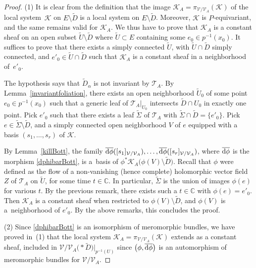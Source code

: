 \documentclass[10pt,a4paper]{amsart}
\numberwithin{equation}{section}
\begin{document}
\begin{proof}
(1) It is clear from the definition that the image $\mathcal{K}_A=\pi_{\mathcal{V}/\mathcal{V}_A}(\mathcal{K})$ of the local system~$\mathcal{K}$ on $E\setminus \tilde{D}$ is a local system on $E\setminus \tilde{D}$. Moreover, $\mathcal{K}$ is $P$-equivariant, and the same remains valid for $\mathcal{K}_A$. We thus have to prove that $\mathcal{K}_A$ is a constant sheaf on an open subset $\tilde{U}\setminus \tilde{D}$ where $\tilde{U}\subset E$ containing some $e_0 \in p^{-1}(x_0)$. It suffices to prove that there exists a simply connected $\tilde{U}$, with $\tilde{U}\cap \tilde{D}$ simply connected, and $e'_0 \in \tilde{U}\cap \tilde{D}$ such that $\mathcal{K}_A$ is a constant sheaf in a neighborhood of~$e'_0$.

The hypothesis says that $\tilde{D}_\alpha$ is not invariant by $\mathcal{T}_A$. By Lemma~\ref{invariantfoliation}, there exists an open neighborhood $\tilde{U}_0$ of some point $e_0 \in p^{-1}(x_0)$ such that a generic leaf of $\mathcal{T}_A\vert_{U_0}$ intersects $\tilde{D}\cap U_0$ in exactly one point. Pick $e'_0$ such that there exists a leaf $\tilde{\Sigma}$ of $\mathcal{T}_A$ with $\tilde{\Sigma}\cap \tilde{D} = \{e'_0\}$. Pick $e\in \tilde{\Sigma}\setminus \tilde{D}$, and a simply connected open neighborhood $V$ of $e$ equipped with a basis $(s_1,\dots,s_r)$ of $\mathcal{K}$.


By Lemma~\ref{killBott}, the family $\overline{{\rm d}\phi}([s_1]_{\mathcal{V}/\mathcal{V}_A}),\dots,\overline{{\rm d}\phi}([s_r]_{\mathcal{V}/\mathcal{V}_A})$, where $\overline{{\rm d}\phi}$ is the morphism \eqref{dphibarBott}, is a~basis of $\phi^*\mathcal{K}_A\big(\phi(V)\setminus \tilde{D}\big)$. Recall that $\phi$ were defined as the flow of a non-vanishing (hence complete) holomorphic vector field $Z$ of $ \mathcal{T}_A$ on $\tilde{U}$, for some time $t\in \mathbb{C}$. In particular, $\tilde{\Sigma}$ is the union of images $\phi(e)$ for various $t$. By the previous remark, there exists such a $t\in \mathbb{C}$ with $\phi(e)=e'_0$. Then $\mathcal{K}_A$ is a constant sheaf when restricted to $\phi(V)\setminus \tilde{D}$, and $\phi(V)$ is a~neighborhood of $e'_0$. By the above remarks, this concludes the proof. %

(2) Since \eqref{dphibarBott} is an isomorphism of meromorphic bundles, we have proved in~(1) that the local system $\mathcal{K}_A=\pi_{\mathcal{V}/\mathcal{V}_A}(\mathcal{K})$ extends as a constant sheaf, included in $\mathcal{V}/\mathcal{V}_A\bigl(* \tilde{D}\bigr)\vert_{p^{-1}(U)}$ since $\big(\phi,\overline{{\rm d}\phi}\big)$ is an automorphism of meromorphic bundles for $\mathcal{V}/\mathcal{V}_A$.


\end{proof}
\end{document}
